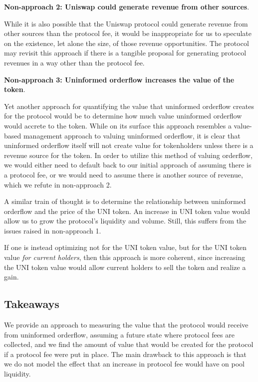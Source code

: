     \textbf{Non-approach 2: Uniswap could generate revenue from other sources}.

    While it is also possible that the Uniswap protocol could generate revenue from other sources than the protocol fee, it would be inappropriate for us to speculate on the existence, let alone the size, of those revenue opportunities. The protocol may revisit this approach if there is a tangible proposal for generating protocol revenues in a way other than the protocol fee.


    \textbf{Non-approach 3: Uninformed orderflow increases the value of the token}.

    Yet another approach for quantifying the value that uninformed orderflow creates for the protocol would be to determine how much value uninformed orderflow would accrete to the token. While on its surface this approach resembles a value-based management approach to valuing uninformed orderflow, it is clear that uninformed orderflow itself will not create value for tokenholders unless there is a revenue source for the token. In order to utilize this method of valuing orderflow, we would either need to default back to our initial approach of assuming there is a protocol fee, or we would need to assume there is another source of revenue, which we refute in non-approach 2.

    A similar train of thought is to determine the relationship between uninformed orderflow and the price of the UNI token. An increase in UNI token value would allow us to grow the protocol's liquidity and volume. Still, this suffers from the issues raised in non-approach 1. %

    If one is instead optimizing not for the UNI token value, but for the UNI token value \textit{for current holders}, then this approach is more coherent, since increasing the UNI token value would allow current holders to sell the token and realize a gain. 

\subsection{Takeaways}
    We provide an approach to measuring the value that the protocol would receive from uninformed orderflow, assuming a future state where protocol fees are collected, and we find the amount of value that would be created for the protocol if a protocol fee were put in place. The main drawback to this approach is that we do not model the effect that an increase in protocol fee would have on pool liquidity.

